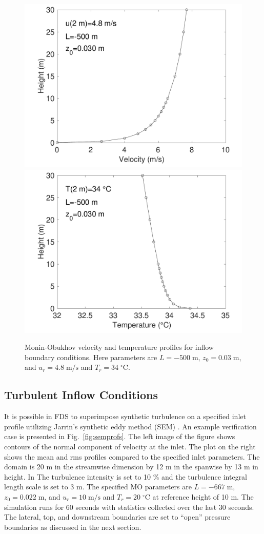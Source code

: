 \documentclass[journal,article,atmosphere,submit,moreauthors,pdftex]{Definitions/mdpi}
\begin{document}
\begin{figure}[ht]
\centering
\includegraphics[width=.45\textwidth]{figures/vel_L=-500.pdf}
\includegraphics[width=.45\textwidth]{figures/tmp_L=-500.pdf}
\caption{Monin-Obukhov velocity and temperature profiles for inflow boundary conditions.  Here parameters are $L=-500\;\mathrm{m}$, $z_0=0.03\;\mathrm{m}$, and $u_r=4.8\;\mathrm{m/s}$ and $T_r=34\;^\circ\mathrm{C}$.} 
\label{fig:MOprofs}
\end{figure}

\subsection{Turbulent Inflow Conditions}

It is possible in FDS to superimpose synthetic turbulence on a specified inlet profile utilizing Jarrin's synthetic eddy method (SEM) \cite{Jarrin:2008}.  An example verification case is presented in Fig.~\ref{fig:semprofs}.  The left image of the figure shows contours of the normal component of velocity at the inlet.  The plot on the right shows the mean and rms profiles compared to the specified inlet parameters.  The domain is 20 m in the streamwise dimension by 12 m in the spanwise by 13 m in height.  In The turbulence intensity is set to 10 \% and the turbulence integral length scale is set to 3 m.  The specified MO parameters are $L=-667\;\mathrm{m}$, $z_0=0.022\;\mathrm{m}$, and $u_r=10\;\mathrm{m/s}$ and $T_r=20\;^\circ\mathrm{C}$ at reference height of 10 m.  The simulation runs for 60 seconds with statistics collected over the last 30 seconds.  The lateral, top, and downstream boundaries are set to ``open'' pressure boundaries as discussed in the next section.
\end{document}

